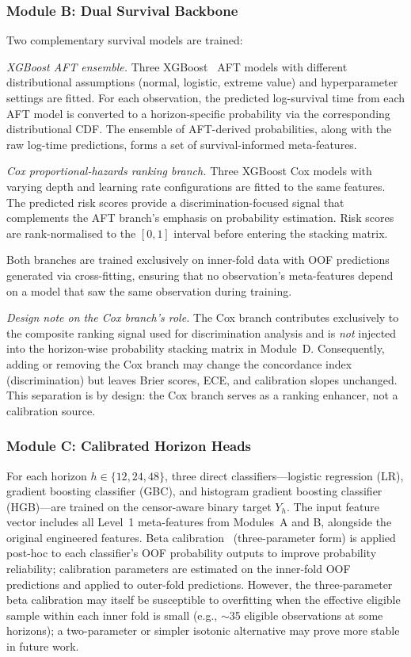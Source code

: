 \documentclass[fire,article,submit,pdftex]{../Definitions/mdpi}
\begin{document}
\subsubsection{Module B: Dual Survival Backbone}

Two complementary survival models are trained:

\emph{XGBoost AFT ensemble.}
Three XGBoost~\cite{Chen2016} AFT models with different distributional assumptions (normal, logistic, extreme value) and hyperparameter settings are fitted.
For each observation, the predicted log-survival time from each AFT model is converted to a horizon-specific probability via the corresponding distributional CDF.
The ensemble of AFT-derived probabilities, along with the raw log-time predictions, forms a set of survival-informed meta-features.

\emph{Cox proportional-hazards ranking branch.}
Three XGBoost Cox models with varying depth and learning rate configurations are fitted to the same features.
The predicted risk scores provide a discrimination-focused signal that complements the AFT branch's emphasis on probability estimation.
Risk scores are rank-normalised to the $[0, 1]$ interval before entering the stacking matrix.

Both branches are trained exclusively on inner-fold data with OOF predictions generated via cross-fitting, ensuring that no observation's meta-features depend on a model that saw the same observation during training.

\emph{Design note on the Cox branch's role.}
The Cox branch contributes exclusively to the composite ranking signal used for discrimination analysis and is \emph{not} injected into the horizon-wise probability stacking matrix in Module~D.
Consequently, adding or removing the Cox branch may change the concordance index (discrimination) but leaves Brier scores, ECE, and calibration slopes unchanged.
This separation is by design: the Cox branch serves as a ranking enhancer, not a calibration source.

\subsubsection{Module C: Calibrated Horizon Heads}

For each horizon $h \in \{12, 24, 48\}$, three direct classifiers---logistic regression (LR), gradient boosting classifier (GBC), and histogram gradient boosting classifier (HGB)---are trained on the censor-aware binary target $Y_h$.
The input feature vector includes all Level~1 meta-features from Modules~A and B, alongside the original engineered features.
Beta calibration~\cite{Kull2017} (three-parameter form) is applied post-hoc to each classifier's OOF probability outputs to improve probability reliability; calibration parameters are estimated on the inner-fold OOF predictions and applied to outer-fold predictions.
However, the three-parameter beta calibration may itself be susceptible to overfitting when the effective eligible sample within each inner fold is small (e.g., $\sim$35 eligible observations at some horizons); a two-parameter or simpler isotonic alternative may prove more stable in future work.
\end{document}
